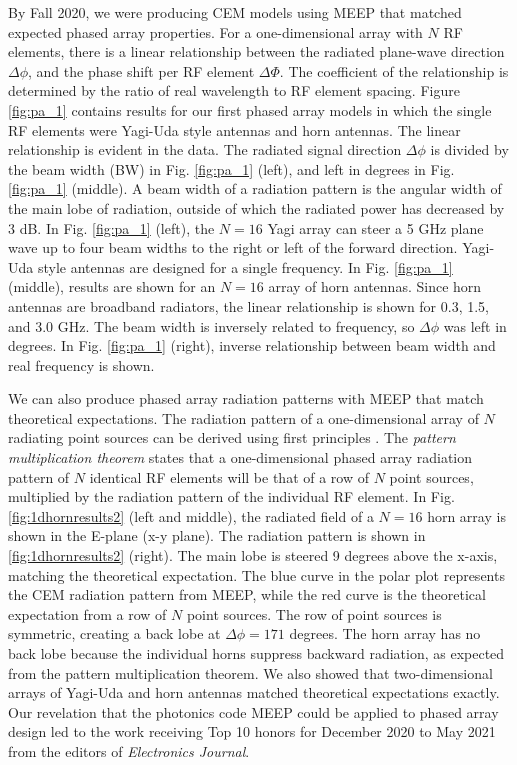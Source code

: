 \documentclass[../../main.tex]{subfiles}
\begin{document}
By Fall 2020, we were producing CEM models using MEEP that matched expected phased array properties.  For a one-dimensional array with $N$ RF elements, there is a linear relationship between the radiated plane-wave direction $\Delta \phi$, and the phase shift per RF element $\Delta \Phi$.  The coefficient of the relationship is determined by the ratio of real wavelength to RF element spacing.  Figure \ref{fig:pa_1} contains results for our first phased array models in which the single RF elements were Yagi-Uda style antennas and horn antennas.  The linear relationship is evident in the data.  The radiated signal direction $\Delta \phi$ is divided by the beam width (BW) in Fig. \ref{fig:pa_1} (left), and left in degrees in Fig. \ref{fig:pa_1} (middle).  A beam width of a radiation pattern is the angular width of the main lobe of radiation, outside of which the radiated power has decreased by 3 dB.  In Fig. \ref{fig:pa_1} (left), the $N=16$ Yagi array can steer a 5 GHz plane wave up to four beam widths to the right or left of the forward direction.  Yagi-Uda style antennas are designed for a single frequency.  In Fig. \ref{fig:pa_1} (middle), results are shown for an $N=16$ array of horn antennas.  Since horn antennas are broadband radiators, the linear relationship is shown for 0.3, 1.5, and 3.0 GHz.  The beam width is inversely related to frequency, so $\Delta \phi$ was left in degrees.  In Fig. \ref{fig:pa_1} (right), inverse relationship between beam width and real frequency is shown. \\ \vspace{2.5mm}

We can also produce phased array radiation patterns with MEEP that match theoretical expectations.  The radiation pattern of a one-dimensional array of $N$ radiating point sources can be derived using first principles \cite{electronics10040415}.  The \textit{pattern multiplication theorem} states that a one-dimensional phased array radiation pattern of $N$ identical RF elements will be that of a row of $N$ point sources, multiplied by the radiation pattern of the individual RF element.  In Fig. \ref{fig:1dhornresults2} (left and middle), the radiated field of a $N=16$ horn array is shown in the E-plane (x-y plane).  The radiation pattern is shown in \ref{fig:1dhornresults2} (right).  The main lobe is steered 9 degrees above the x-axis, matching the theoretical expectation.  The blue curve in the polar plot represents the CEM radiation pattern from MEEP, while the red curve is the theoretical expectation from a row of $N$ point sources.  The row of point sources is symmetric, creating a back lobe at $\Delta \phi = 171$ degrees.  The horn array has no back lobe because the individual horns suppress backward radiation, as expected from the pattern multiplication theorem.  We also showed that two-dimensional arrays of Yagi-Uda and horn antennas matched theoretical expectations exactly.  Our revelation that the photonics code MEEP could be applied to phased array design led to the work receiving Top 10 honors for December 2020 to May 2021 from the editors of \textit{Electronics Journal}. \\ \vspace{2.5mm}
\end{document}
